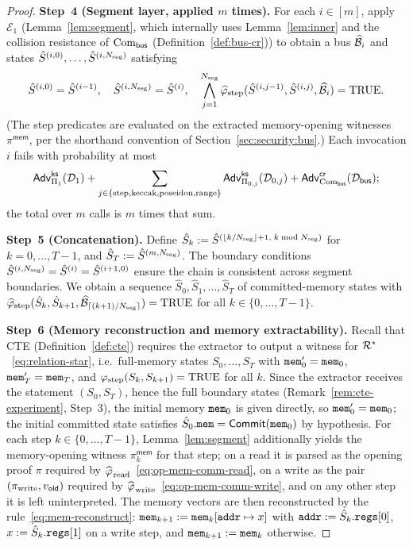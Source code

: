 \begin{proof}
\textbf{Step~4 (Segment layer, applied $m$ times).}
For each $i\in[m]$, apply $\mathcal{E}_1$ (Lemma~\ref{lem:segment},
which internally uses Lemma~\ref{lem:inner} and the collision resistance of $\mathrm{Com}_{\mathsf{bus}}$
(Definition~\ref{def:bus-cr})) to obtain
a bus $\widehat{\mathcal{B}}_i$ and states
$\hat{S}^{(i,0)},\ldots,\hat{S}^{(i,N_{\mathrm{seg}})}$ satisfying
\[
  \hat{S}^{(i,0)}=\hat{S}^{(i-1)},\quad
  \hat{S}^{(i,N_{\mathrm{seg}})}=\hat{S}^{(i)},\quad
  \bigwedge_{j=1}^{N_{\mathrm{seg}}}
    \widehat{\varphi}_{\mathrm{step}}(\hat{S}^{(i,j-1)},\hat{S}^{(i,j)},\widehat{\mathcal{B}}_i)
    =\mathrm{TRUE}.
\]
(The step predicates are evaluated on the extracted memory-opening witnesses
$\pi^{\mathsf{mem}}$, per the shorthand convention of
Section~\ref{sec:security:bus}.)
Each invocation $i$ fails with probability at most
\[
  \mathsf{Adv}^{\mathsf{ks}}_{\Pi_1}(\mathcal{D}_1)
+\sum_{j\in\{\mathrm{step},\mathrm{keccak},\mathrm{poseidon},\mathrm{range}\}}\mathsf{Adv}^{\mathsf{ks}}_{\Pi_{0,j}}(\mathcal{D}_{0,j})
+\mathsf{Adv}^{\mathsf{cr}}_{\mathrm{Com}_{\mathsf{bus}}}(\mathcal{D}_{\mathsf{bus}});
\]
the total over $m$ calls is $m$ times that sum.

\textbf{Step~5 (Concatenation).}
Define $\hat{S}_k:=\hat{S}^{(\lfloor k/N_{\mathrm{seg}}\rfloor+1,\;k\bmod N_{\mathrm{seg}})}$
for $k=0,\ldots,T-1$, and $\hat{S}_T:=\hat{S}^{(m,N_{\mathrm{seg}})}$.  The boundary conditions $\hat{S}^{(i,N_{\mathrm{seg}})}=\hat{S}^{(i)}=\hat{S}^{(i+1,0)}$
ensure the chain is consistent across segment boundaries.  We obtain a
sequence $\hat{S}_0,\hat{S}_1,\ldots,\hat{S}_T$ of committed-memory states
with $\widehat{\varphi}_{\mathrm{step}}(\hat{S}_k,\hat{S}_{k+1},\widehat{\mathcal{B}}_{\lceil(k+1)/N_{\mathrm{seg}}\rceil})=\mathrm{TRUE}$
for all $k\in\{0,\ldots,T-1\}$.

\textbf{Step~6 (Memory reconstruction and memory extractability).}
Recall that CTE (Definition~\ref{def:cte}) requires the extractor to output a
witness for $\mathcal{R}^*$~\eqref{eq:relation-star}, i.e.\ full-memory states
$S_0,\ldots,S_T$ with $\mathtt{mem}_0'=\mathtt{mem}_0$, $\mathtt{mem}_T'=\mathtt{mem}_T$,
and $\varphi_{\mathrm{step}}(S_k,S_{k+1})=\mathrm{TRUE}$ for all $k$.
Since the extractor receives the statement $(S_0,S_T)$, hence the full boundary
states (Remark~\ref{rem:cte-experiment}, Step~3), the initial memory $\mathtt{mem}_0$ is given
directly, so $\mathtt{mem}_0'=\mathtt{mem}_0$; the initial committed state satisfies
$\hat{S}_0.\mathtt{mem}=\mathsf{Commit}(\mathtt{mem}_0)$ by hypothesis.
For each step $k\in\{0,\ldots,T-1\}$, Lemma~\ref{lem:segment}
additionally yields the memory-opening witness $\pi^{\mathsf{mem}}_k$ for that
step; on a read it is parsed as the opening proof $\pi$ required by
$\widehat{\varphi_{\mathrm{}}}_{\mathrm{read}}$~\eqref{eq:op-mem-comm-read}, on a write as the pair
$(\pi_{\mathrm{write}},v_{\mathsf{old}})$ required by
$\widehat{\varphi_{\mathrm{}}}_{\mathrm{write}}$~\eqref{eq:op-mem-comm-write}, and on any other step
it is left uninterpreted.  The memory vectors are then reconstructed
by the rule~\eqref{eq:mem-reconstruct}: $\mathtt{mem}_{k+1}:=\mathtt{mem}_k[\mathtt{addr}\mapsto x]$
with $\mathtt{addr}:=\hat{S}_k.\mathtt{regs}[0]$, $x:=\hat{S}_k.\mathtt{regs}[1]$ on a write step, and
$\mathtt{mem}_{k+1}:=\mathtt{mem}_k$ otherwise.


\end{proof}
